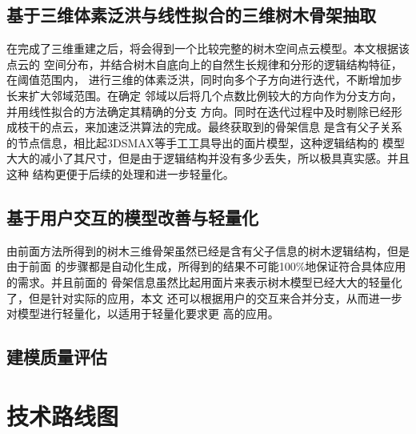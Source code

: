 \subsection{基于三维体素泛洪与线性拟合的三维树木骨架抽取}
\label{subsec:treesklextract}
在完成了三维重建之后，将会得到一个比较完整的树木空间点云模型。本文根据该点云的
空间分布，并结合树木自底向上的自然生长规律和分形的逻辑结构特征，在阈值范围内，
进行三维的体素泛洪，同时向多个子方向进行迭代，不断增加步长来扩大邻域范围。在确定
邻域以后将几个点数比例较大的方向作为分支方向，并用线性拟合的方法确定其精确的分支
方向。同时在迭代过程中及时剔除已经形成枝干的点云，来加速泛洪算法的完成。最终获取到的骨架信息
是含有父子关系的节点信息，相比起3DSMAX等手工工具导出的面片模型，这种逻辑结构的
模型大大的减小了其尺寸，但是由于逻辑结构并没有多少丢失，所以极具真实感。并且这种
结构更便于后续的处理和进一步轻量化。

\subsection{基于用户交互的模型改善与轻量化}
\label{subsec:userinteraction}
由前面方法所得到的树木三维骨架虽然已经是含有父子信息的树木逻辑结构，但是由于前面
的步骤都是自动化生成，所得到的结果不可能100\%地保证符合具体应用的需求。并且前面的
骨架信息虽然比起用面片来表示树木模型已经大大的轻量化了，但是针对实际的应用，本文
还可以根据用户的交互来合并分支，从而进一步对模型进行轻量化，以适用于轻量化要求更
高的应用。

\subsection{建模质量评估}
\label{subsec:qualityevaluation}

\section{技术路线图}
\label{sec:techrouteimg}

